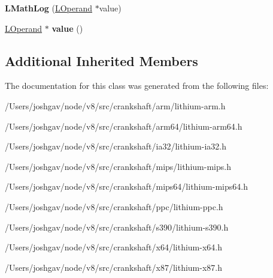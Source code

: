 \begin{DoxyCompactItemize}
\item 
{\bfseries L\+Math\+Log} (\hyperlink{classv8_1_1internal_1_1_l_operand}{L\+Operand} $\ast$value)\hypertarget{classv8_1_1internal_1_1_l_math_log_a950bc418f3ba5e59048dcad30d5ce2ae}{}\label{classv8_1_1internal_1_1_l_math_log_a950bc418f3ba5e59048dcad30d5ce2ae}

\item 
\hyperlink{classv8_1_1internal_1_1_l_operand}{L\+Operand} $\ast$ {\bfseries value} ()\hypertarget{classv8_1_1internal_1_1_l_math_log_a3c1cc9244ef5167e73537c6b9e58b341}{}\label{classv8_1_1internal_1_1_l_math_log_a3c1cc9244ef5167e73537c6b9e58b341}

\end{DoxyCompactItemize}
\subsection*{Additional Inherited Members}


The documentation for this class was generated from the following files\+:\begin{DoxyCompactItemize}
\item 
/\+Users/joshgav/node/v8/src/crankshaft/arm/lithium-\/arm.\+h\item 
/\+Users/joshgav/node/v8/src/crankshaft/arm64/lithium-\/arm64.\+h\item 
/\+Users/joshgav/node/v8/src/crankshaft/ia32/lithium-\/ia32.\+h\item 
/\+Users/joshgav/node/v8/src/crankshaft/mips/lithium-\/mips.\+h\item 
/\+Users/joshgav/node/v8/src/crankshaft/mips64/lithium-\/mips64.\+h\item 
/\+Users/joshgav/node/v8/src/crankshaft/ppc/lithium-\/ppc.\+h\item 
/\+Users/joshgav/node/v8/src/crankshaft/s390/lithium-\/s390.\+h\item 
/\+Users/joshgav/node/v8/src/crankshaft/x64/lithium-\/x64.\+h\item 
/\+Users/joshgav/node/v8/src/crankshaft/x87/lithium-\/x87.\+h\end{DoxyCompactItemize}
